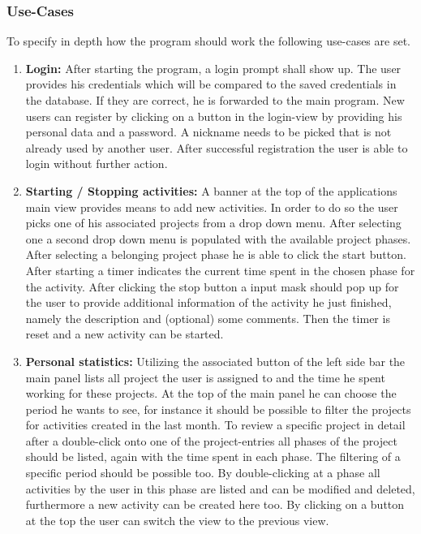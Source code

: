 \subsubsection{Use-Cases}
To specify in depth how the program should work the following use-cases are set.
\begin{enumerate}
\item \textbf{Login:} After starting the program, a login prompt shall show up. The user provides his credentials which will be compared to the saved credentials in the database. If they are correct, he is forwarded to the main program. New users can register by clicking on a button in the login-view by providing his personal data and a password. A nickname needs to be picked that is not already used by another user. After successful registration the user is able to login without further action.

\item \textbf{Starting / Stopping activities:} A banner at the top of the applications main view provides means to add new activities. In order to do so the user picks one of his associated projects from a drop down menu. After selecting one a second drop down menu is populated with the available project phases. After selecting a belonging project phase he is able to click the start button. After starting a timer indicates the current time spent in the chosen phase for the activity. After clicking the stop button a input mask should pop up for the user to provide additional information of the activity he just finished, namely the description and (optional) some comments. Then the timer is reset and a new activity can be started. 

\item \textbf{Personal statistics:} Utilizing the associated button of the left side bar the main panel lists all project the user is assigned to and the time he spent working for these projects. At the top of the main panel he can choose the period he wants to see, for instance it should be possible to filter the projects for activities created in the last month. To review a specific project in detail after a double-click onto one of the project-entries all phases of the project should be listed, again with the time spent in each phase. The filtering of a specific period should be possible too. By double-clicking at a phase all activities by the user in this phase are listed and can be modified and deleted, furthermore a new activity can be created here too. By clicking on a button at the top the user can switch the view to the previous view.


\end{enumerate}

